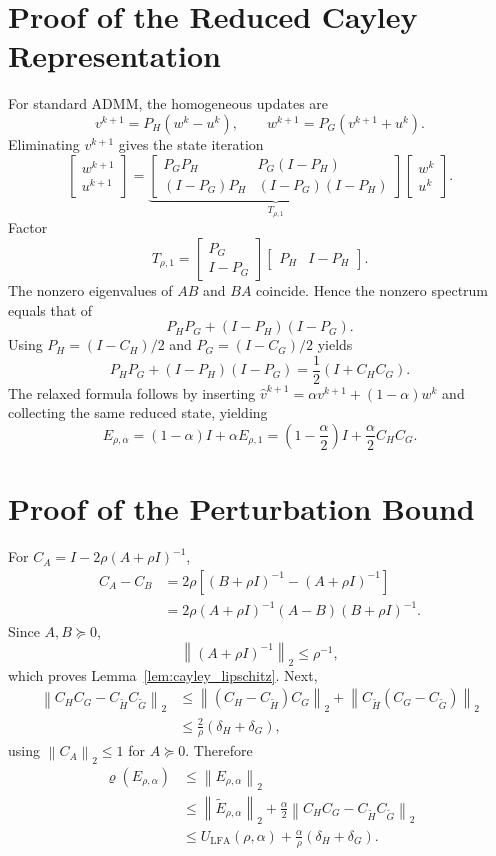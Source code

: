 \documentclass[11pt]{article}
\theoremstyle{definition}
\newcommand{\I}{\mathbf{I}}
\newcommand{\norm}[1]{\left\lVert #1\right\rVert}
\newcommand{\spr}{\varrho}
\begin{document}
\section{Proof of the Reduced Cayley Representation}\label{app:reduced}
For standard ADMM, the homogeneous updates are
\[
v^{k+1}=P_H(w^k-u^k),
\qquad
w^{k+1}=P_G(v^{k+1}+u^k).
\]
Eliminating $v^{k+1}$ gives the state iteration
\[
\begin{bmatrix}w^{k+1}\\u^{k+1}\end{bmatrix}
=
\underbrace{\begin{bmatrix}
P_GP_H&P_G(I-P_H)\\
(I-P_G)P_H&(I-P_G)(I-P_H)
\end{bmatrix}}_{T_{\rho,1}}
\begin{bmatrix}w^k\\u^k\end{bmatrix}.
\]
Factor
\[
T_{\rho,1}
=
\begin{bmatrix}P_G\\I-P_G\end{bmatrix}
\begin{bmatrix}P_H&I-P_H\end{bmatrix}.
\]
The nonzero eigenvalues of $AB$ and $BA$ coincide. Hence the nonzero spectrum equals that of
\[
P_HP_G+(I-P_H)(I-P_G).
\]
Using $P_H=(I-C_H)/2$ and $P_G=(I-C_G)/2$ yields
\[
P_HP_G+(I-P_H)(I-P_G)=\frac12(I+C_HC_G).
\]
The relaxed formula follows by inserting $\widehat v^{k+1}=\alpha v^{k+1}+(1-\alpha)w^k$ and collecting the same reduced state, yielding
\[
E_{\rho,\alpha}=(1-\alpha)I+\alpha E_{\rho,1}
=\left(1-\frac\alpha2\right)I+\frac\alpha2 C_HC_G.
\]

\section{Proof of the Perturbation Bound}\label{app:perturbation}
For $C_A=I-2\rho(A+\rho I)^{-1}$,
\begin{align*}
C_A-C_B
&=2\rho\left[(B+\rho I)^{-1}-(A+\rho I)^{-1}\right]\\
&=2\rho(A+\rho I)^{-1}(A-B)(B+\rho I)^{-1}.
\end{align*}
Since $A,B\succeq0$,
\[
\norm{(A+\rho I)^{-1}}_2\le\rho^{-1},
\]
which proves Lemma~\ref{lem:cayley_lipschitz}. Next,
\begin{align*}
\norm{C_HC_G-C_{\widetilde H}C_{\widetilde G}}_2
&\le
\norm{(C_H-C_{\widetilde H})C_G}_2
+\norm{C_{\widetilde H}(C_G-C_{\widetilde G})}_2\\
&\le\frac{2}{\rho}(\delta_H+\delta_G),
\end{align*}
using $\norm{C_A}_2\le1$ for $A\succeq0$. Therefore
\begin{align*}
\spr(E_{\rho,\alpha})
&\le\norm{E_{\rho,\alpha}}_2\\
&\le\norm{\widetilde E_{\rho,\alpha}}_2
+\frac{\alpha}{2}
\norm{C_HC_G-C_{\widetilde H}C_{\widetilde G}}_2\\
&\le U_{\mathrm{LFA}}(\rho,\alpha)
+\frac{\alpha}{\rho}(\delta_H+\delta_G).
\end{align*}
\end{document}
